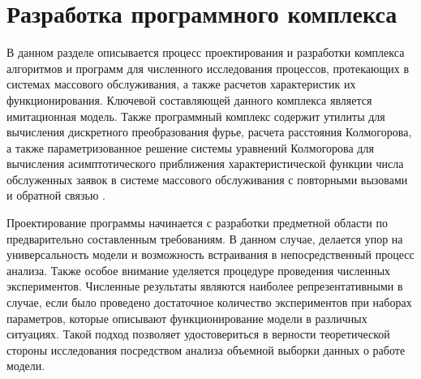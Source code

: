 \section {Разработка программного комплекса}
В данном разделе описывается процесс проектирования и разработки комплекса алгоритмов и программ для численного исследования процессов, протекающих в системах массового обслуживания, а также расчетов характеристик их функционирования. Ключевой составляющей данного комплекса является имитационная модель. Также программный комплекс содержит утилиты для вычисления дискретного преобразования фурье, расчета расстояния Колмогорова, а также параметризованное решение системы уравнений Колмогорова для вычисления асимптотического приближения характеристической функции числа обслуженных заявок в системе массового обслуживания с повторными вызовами и обратной связью \cite{blaginin2021approximation}.

 Проектирование программы начинается с разработки предметной области по предварительно составленным требованиям. В данном случае, делается упор на универсальность модели и возможность встраивания в непосредственный	процесс анализа. Также особое внимание уделяется процедуре проведения численных экспериментов. Численные результаты являются наиболее репрезентативными в случае, если было проведено достаточное количество экспериментов при наборах параметров, которые описывают функционирование модели в различных ситуациях. Такой подход позволяет удостовериться в верности теоретической стороны исследования посредством анализа объемной выборки данных о работе модели.

